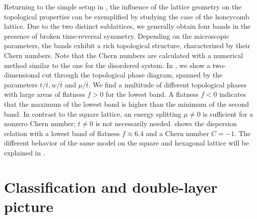 
Returning to the simple setup in , the influence of the lattice geometry on the topological properties can be exemplified by studying the case of the honeycomb lattice.
Due to the two distinct sublattices, we generally obtain four bands in the presence of broken time-reversal symmetry.
Depending on the microscopic parameters, the bands exhibit a rich topological structure, characterized by their Chern numbers.
Note that the Chern numbers are calculated with a numerical method similar to the one for the disordered system.
In , we show a two-dimensional cut through the topological phase diagram, spanned by the parameters $t/\bar{t}, w/\bar{t}$ and $\mu/\bar{t}$.
We find a multitude of different topological phases with large areas of flatness $f > 0$ for the lowest band.
A flatness $f < 0$ indicates that the maximum of the lowest band is higher than the minimum of the second band.
In contrast to the square lattice, an energy splitting $\mu \ne 0$ is sufficient for a nonzero Chern number; $t\ne 0$ is not necessarily needed.
 shows the dispersion relation with a lowest band of flatness $f\approx 6.4$ and a Chern number $C=-1$.
The different behavior of the same model on the square and hexagonal lattice will be explained in .


\section{Classification and double-layer picture}

